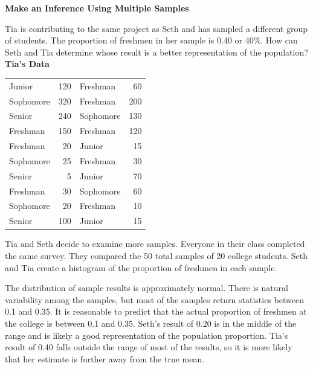 \documentclass{article}
\newenvironment{example}[1]{}{}         %
\newcommand{\answer}[1]{}               %
\newcommand{\placeholder}[2]{}          %
\newcommand{\te}[1]{}                   %
\begin{document}
\begin{example}{2}
\textbf{Make an Inference Using Multiple Samples}
\te{APPLICATION}
Tia is contributing to the same project as Seth and has sampled a different group of students. The proportion of freshmen in her sample is 0.40 or 40\%. How can Seth and Tia determine whose result is a better representation of the population?
\textbf{Tia's Data}
\begin{tabular}{lrlr}
Junior & 120 & Freshman & 60 \\
Sophomore & 320 & Freshman & 200 \\
Senior & 240 & Sophomore & 130 \\
Freshman & 150 & Freshman & 120 \\
Freshman & 20 & Junior & 15 \\
Sophomore & 25 & Freshman & 30 \\
Senior & 5 & Junior & 70 \\
Freshman & 30 & Sophomore & 60 \\
Sophomore & 20 & Freshman & 10 \\
Senior & 100 & Junior & 15 \\
\end{tabular}
Tia and Seth decide to examine more samples. Everyone in their class completed the same survey. They compared the 50 total samples of 20 college students. Seth and Tia create a histogram of the proportion of freshmen in each sample.
\placeholder{graph}{Results of 50 Samples: blue histogram. Horizontal Proportion of Freshmen labels 0,0.1,0.15,0.2,0.25,0.3,0.35,0.4, equally spaced as printed; vertical Number of Samples 0 to 16 every 2. Seven bars have heights 2,7,9,14,11,6,1. No arrows.}
\te{Printed first interval 0 to 0.1 is drawn the same width as later intervals of 0.05.}
\te{Callout: In 6 samples out of 50, between 30\% and 35\% of the sample participants are freshmen.}
\te{Callout: In 47 samples out of 50, the sample proportion falls between 0.1 and 0.35.}
\te{GENERALIZE Most samples provide a reasonable estimate of the parameter. The average value of a set of sample statistics will approximate the population parameter with high precision.}
The distribution of sample results is approximately normal. There is natural variability among the samples, but most of the samples return statistics between 0.1 and 0.35. It is reasonable to predict that the actual proportion of freshmen at the college is between 0.1 and 0.35.
Seth's result of 0.20 is in the middle of the range and is likely a good representation of the population proportion. Tia's result of 0.40 falls outside the range of most of the results, so it is more likely that her estimate is further away from the true mean.
\answer{Compare more samples; Seth's result of 0.20 is likely a good representation of the population proportion.}
\end{example}
\end{document}
